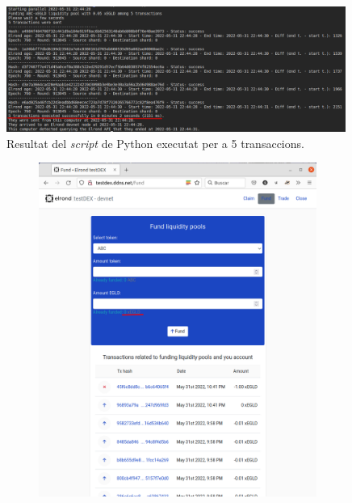 \documentclass[11pt,a4paper]{article}
\begin{document}
\begin{figure}[h]
\includegraphics[width=0.99\textwidth]{send5trans.png}
\centering
\caption{Resultat del \textit{script} de Python executat per a 5 transaccions.}\label{fig:send5trans}
\end{figure} 

\begin{figure}[!htb]
	\begin{subfigure}[b]{0.47\textwidth}
	  \includegraphics[width=\linewidth]{send1000trans1.png}
	\end{subfigure}\hfill
	\begin{subfigure}[b]{0.47\textwidth}

\end{subfigure}
\end{figure}
\end{document}
